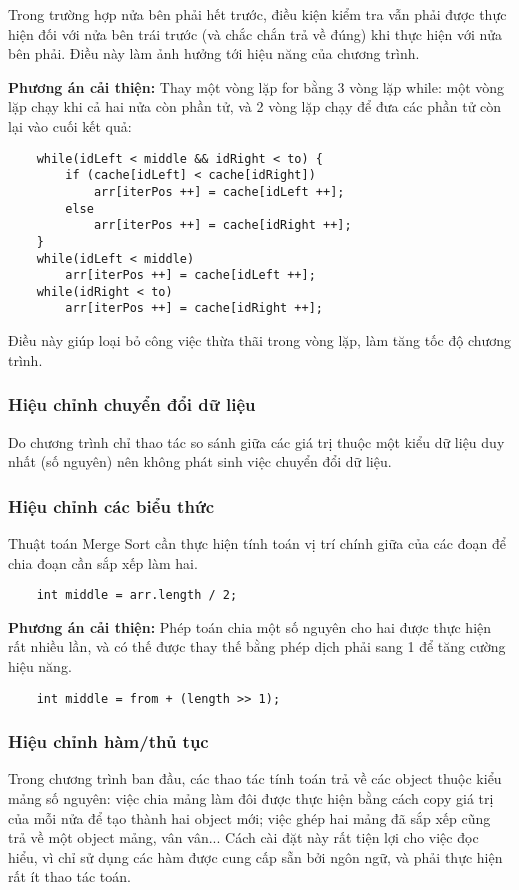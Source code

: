 \documentclass{article}
\begin{document}
    Trong trường hợp nửa bên phải hết trước, điều kiện kiểm tra vẫn phải được thực 
    hiện đối với nửa bên trái trước (và chắc chắn trả về đúng) khi thực hiện với 
    nửa bên phải. Điều này làm ảnh hưởng tới hiệu năng của chương trình.

    \textbf{Phương án cải thiện:} Thay một vòng lặp for bằng 3 vòng lặp while: một vòng
    lặp chạy khi cả hai nửa còn phần tử, và 2 vòng lặp chạy để đưa các phần tử còn 
    lại vào cuối kết quả:

    \begin{lstlisting}
    while(idLeft < middle && idRight < to) {
        if (cache[idLeft] < cache[idRight])
            arr[iterPos ++] = cache[idLeft ++];
        else
            arr[iterPos ++] = cache[idRight ++];
    }
    while(idLeft < middle)
        arr[iterPos ++] = cache[idLeft ++];
    while(idRight < to)
        arr[iterPos ++] = cache[idRight ++];
    \end{lstlisting}

    Điều này giúp loại bỏ công việc thừa thãi trong vòng lặp, làm tăng tốc độ chương 
    trình.

    \subsubsection{Hiệu chỉnh chuyển đổi dữ liệu}
    Do chương trình chỉ thao tác so sánh giữa các giá trị thuộc một kiểu dữ liệu duy 
    nhất (số nguyên) nên không phát sinh việc chuyển đổi dữ liệu.

    \subsubsection{Hiệu chỉnh các biểu thức}
    Thuật toán Merge Sort cần thực hiện tính toán vị trí chính giữa của các đoạn để 
    chia đoạn cần sắp xếp làm hai.

    \begin{lstlisting}
    int middle = arr.length / 2;
    \end{lstlisting}

    \textbf{Phương án cải thiện:} Phép toán chia một số nguyên cho hai được thực hiện rất nhiều lần, và có thế 
    được thay thế bằng phép dịch phải sang 1 để tăng cường hiệu năng.

    \begin{lstlisting}
    int middle = from + (length >> 1);
    \end{lstlisting}
    
    \subsubsection{Hiệu chỉnh hàm/thủ tục}
    Trong chương trình ban đầu, các thao tác tính toán trả về các object thuộc kiểu mảng số nguyên:
    việc chia mảng làm đôi được thực hiện bằng cách copy giá trị của mỗi nửa để tạo thành hai object
    mới; việc ghép hai mảng đã sắp xếp cũng trả về một object mảng, vân vân... Cách cài đặt này rất 
    tiện lợi cho việc đọc hiểu, vì chỉ sử dụng các hàm được cung cấp sẵn bởi ngôn ngữ, và phải thực 
    hiện rất ít thao tác toán. 
    
\end{document}
